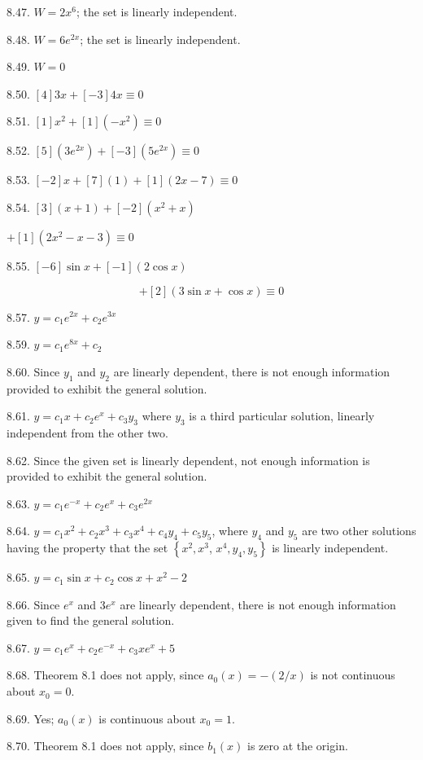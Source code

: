 \documentclass[10pt]{article}
\begin{document}
8.47. $W=2 x^{6}$; the set is linearly independent.

8.48. $W=6 e^{2 x}$; the set is linearly independent.

8.49. $W=0$

8.50. $[4] 3 x+[-3] 4 x \equiv 0$

8.51. $[1] x^{2}+[1]\left(-x^{2}\right) \equiv 0$

8.52. $[5]\left(3 e^{2 x}\right)+[-3]\left(5 e^{2 x}\right) \equiv 0$

8.53. $[-2] x+[7](1)+[1](2 x-7) \equiv 0$

8.54. $[3](x+1)+[-2]\left(x^{2}+x\right)$

$+[1]\left(2 x^{2}-x-3\right) \equiv 0$

8.55. $[-6] \sin x+[-1](2 \cos x)$

$$
+[2](3 \sin x+\cos x) \equiv 0
$$

8.57. $y=c_{1} e^{2 x}+c_{2} e^{3 x}$

8.59. $y=c_{1} e^{8 x}+c_{2}$

8.60. Since $y_{1}$ and $y_{2}$ are linearly dependent, there is not enough information provided to exhibit the general solution.

8.61. $y=c_{1} x+c_{2} e^{x}+c_{3} y_{3}$ where $y_{3}$ is a third particular solution, linearly independent from the other two.

8.62. Since the given set is linearly dependent, not enough information is provided to exhibit the general solution.

8.63. $y=c_{1} e^{-x}+c_{2} e^{x}+c_{3} e^{2 x}$

8.64. $y=c_{1} x^{2}+c_{2} x^{3}+c_{3} x^{4}+c_{4} y_{4}+c_{5} y_{5}$, where $y_{4}$ and $y_{5}$ are two other solutions having the property that the set $\left\{x^{2}, x^{3}\right.$, $\left.x^{4}, y_{4}, y_{5}\right\}$ is linearly independent.

8.65. $y=c_{1} \sin x+c_{2} \cos x+x^{2}-2$

8.66. Since $e^{x}$ and $3 e^{x}$ are linearly dependent, there is not enough information given to find the general solution.

8.67. $y=c_{1} e^{x}+c_{2} e^{-x}+c_{3} x e^{x}+5$

8.68. Theorem 8.1 does not apply, since $a_{0}(x)=-(2 / x)$ is not continuous about $x_{0}=0$.

8.69. Yes; $a_{0}(x)$ is continuous about $x_{0}=1$.

8.70. Theorem 8.1 does not apply, since $b_{1}(x)$ is zero at the origin.
\end{document}
